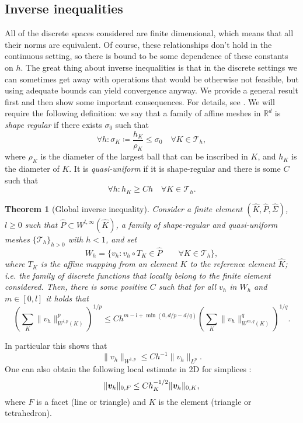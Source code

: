 \documentclass{article}
\renewcommand{\vec}{\vectorsym}
\newcommand{\R}{\mathbb{R}}
\newcommand{\T}{\mathcal{T}}
\newtheorem{theorem}{Theorem}
\begin{document}
\subsection{Inverse inequalities}
All of the discrete spaces considered are finite dimensional, which means that all their norms are equivalent. Of course, these relationships don't hold in the continuous setting, so there is bound to be some dependence of these constants on $h$. The great thing about inverse inequalities is that in the discrete settings we can sometimes get away with operations that would be otherwise not feasible, but using adequate bounds can yield convergence anyway. We provide a general result first and then show some important consequences. For details, see \cite{ern2004theory}. We will require the following definition: we say that a family of affine meshes in $\R^d$ is \emph{shape regular} if there exists $\sigma_0$ such that 
    $$ \forall h: \sigma_K\coloneqq \frac{h_K}{\rho_K} \leq \sigma_0 \quad\forall K\in \T_h, $$
where $\rho_K$ is the diameter of the largest ball that can be inscribed in $K$, and $h_K$ is the diameter of $K$. It is \emph{quasi-uniform} if it is shape-regular and there is some $C$ such that
        $$ \forall h: h_K \geq C h \quad \forall K\in \T_h. $$

    \begin{theorem}[Global inverse inequality]
        Consider a finite element $(\hat K, \hat P, \hat \Sigma)$, $l\geq 0$ such that $\hat P\subset W^{l,\infty}(\hat K)$, a family of shape-regular and quasi-uniform meshes $\{\T_h\}_{h>0}$ with $h<1$, and set
            $$ W_h = \{v_h: v_h\circ T_K \in \hat P \qquad\forall K\in \T_h \}, $$
        where $T_K$ is the affine mapping from an element $K$ to the reference element $\hat K$; i.e. the family of discrete functions that locally belong to the finite element considered. Then, there is some positive $C$ such that for all $v_h$ in $W_h$ and $m\in [0,l]$ it holds that
            $$ \left(\sum_K \| v_h\|^p_{W^{l,p}(K)}\right)^{1/p} \leq Ch^{m-l+\min(0, d/p - d/q)} \left(\sum_K \|v_h\|_{W^{m,q}(K)}^q\right)^{1/q}. $$
    \end{theorem}
In particular this shows that
    $$ \| v_h \|_{W^{1,p}} \leq C h^{-1} \| v_h \|_{L^p}. $$
One can also obtain the following local estimate in 2D for simplices \cite{warburton2003constants}:
    $$ \| \vec v_h \|_{0,F} \leq C h_K^{-1/2} \| \vec v_h \|_{0,K}, $$
where $F$ is a facet (line or triangle) and $K$ is the element (triangle or tetrahedron).
\end{document}
